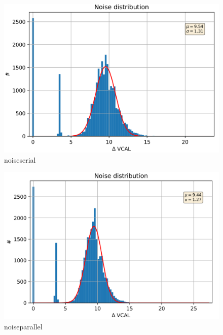 \begin{figure}
\centering
\includegraphics[scale=.3]{Immagini/NoiseSerial}
\caption{noiseserial}
\label{noiseserial}
\end{figure}

\begin{figure}
\centering
\includegraphics[scale=.3]{Immagini/NoiseParallel}
\caption{noiseparallel}
\label{noiseparallel}
\end{figure}